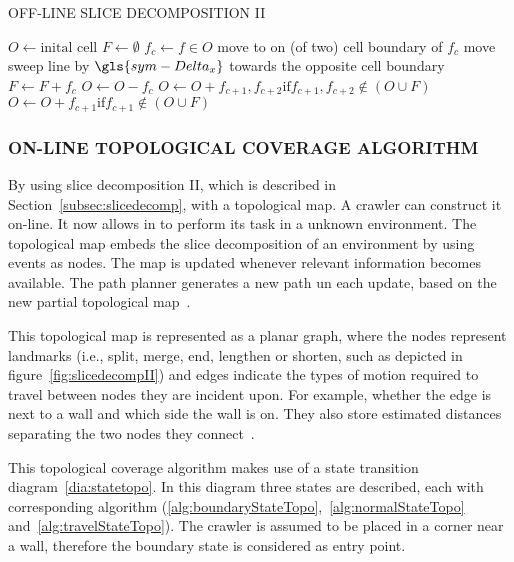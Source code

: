 \begin{RoyalAlgorithm}[label=alg:offlineslicedecompositionII]{OFF-LINE SLICE DECOMPOSITION II}
	\begin{algorithmic}[1]
		\State $ O \gets \text{inital cell} $
		\State $ F \gets \emptyset $
			\State $f_c \gets f \in O $
			\State move to on (of two) cell boundary of $ f_c $
			\Repeat
				\State move sweep line by $ \gls{sym-Delta_x}  $ towards the opposite cell boundary
					\State $ F \gets F + f_c $
					\State $ O \gets O - f_c $
						\State $ O \gets O + f_{c+1},f_{c+2} \text{if} f_{c+1},f_{c+2} \notin (O \cup F) $
					\EndIf
						\State $ O \gets O + f_{c+1} \text{if} f_{c+1} \notin (O \cup F) $
					\EndIf
				\EndIf
		\EndWhile
		\EndProcedure
	\end{algorithmic}
\end{RoyalAlgorithm}

\subsubsection{ON-LINE TOPOLOGICAL COVERAGE ALGORITHM}
By using slice decomposition II, which is described in Section~\ref{subsec:slicedecomp}, with a topological map. A
crawler can construct it on-line. It now allows in to perform its task in a unknown environment. The topological map
embeds the slice decomposition of an environment by using events as nodes. The map is updated whenever relevant
information becomes available. The path planner  generates a new path un each update, based on the new partial
topological map~\cite{wong_qualitative_2006}.

This topological map is represented as a planar graph, where the nodes represent landmarks (i.e., split, merge, end,
lengthen or shorten, such as depicted in figure~\ref{fig:slicedecompII}) and edges indicate the types of motion required
to travel between nodes they are incident upon. For example, whether the edge is next to a wall and which side the wall
is on. They also store estimated distances separating the two nodes they connect~\cite{galceran_coverage_2012}.

This topological coverage algorithm makes use of a state transition diagram~\ref{dia:statetopo}. In this diagram three
states are described, each with corresponding algorithm (\ref{alg:boundaryStateTopo},~\ref{alg:normalStateTopo}
and~\ref{alg:travelStateTopo}). The crawler is assumed to be placed in a corner near a wall, therefore the boundary state
is considered as entry point.

